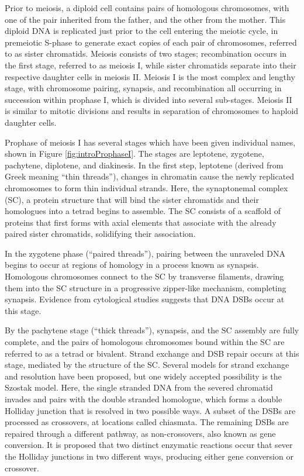 Prior to meiosis, a diploid cell contains pairs of homologous chromosomes, with one of the pair inherited from the father, and the other from the mother.
This diploid DNA is replicated just prior to the cell entering the meiotic cycle, in premeiotic S-phase\cite{Bell2002} to generate exact copies of each pair of chromosomes, referred to as sister chromatids.
Meiosis consists of two stages; recombination occurs in the first stage, referred to as meiosis I, while sister chromatids separate into their respective daughter cells in meiosis II.
Meiosis I is the most complex and lengthy stage, with chromosome pairing, synapsis, and recombination all occurring in succession within prophase I, which is  divided into several sub-stages.
Meiosis II is similar to mitotic divisions and results in separation of chromosomes to haploid daughter cells.

Prophase of meiosis I has several stages which have been given individual names, shown in Figure \ref{fig:introProphaseI}.
The stages are leptotene, zygotene, pachytene, diplotene, and diakinesis.
In the first step, leptotene (derived from Greek meaning ``thin threads''), changes in chromatin cause the newly replicated chromosomes to form thin individual strands.
Here, the synaptonemal complex (SC), a protein structure that will bind the sister chromatids and their homologues into a tetrad begins to assemble.
The SC consists of a scaffold of proteins that first forms with axial elements that associate with the already paired sister chromatids, solidifying their association.

In the zygotene phase (``paired threads''), pairing between the unraveled DNA begins to occur at regions of homology in a process known as synapsis.
Homologous chromosomes connect to the SC by transverse filaments, drawing them into the SC structure in a progressive zipper-like mechanism, completing synapsis\cite{Yang2009}.
Evidence from cytological studies suggests that DNA DSBs occur at this stage\cite{Oliver-Bonet2005,Gruhn2013}.

By the pachytene stage (``thick threads''), synapsis, and the SC assembly are fully complete, and the pairs of homologous chromosomes bound within the SC are referred to as a tetrad or bivalent.
Strand exchange and DSB repair occurs at this stage, mediated by the structure of the SC.
Several models for strand exchange and resolution have been proposed, but one widely accepted possibility is the Szostak model.
Here, the single stranded DNA from the severed chromatid invades and pairs with the double stranded homologue, which forms a double Holliday junction that is resolved in two possible ways\cite{Szostak1983}.
A subset of the DSBs are processed as crossovers, at locations called chiasmata.
The remaining DSBs are repaired through a different pathway, as non-crossovers, also known as gene conversion.
It is proposed that two distinct enzymatic reactions occur that sever the Holliday junctions in two different ways, producing either gene conversion or crossover\cite{Baudat2013}.

